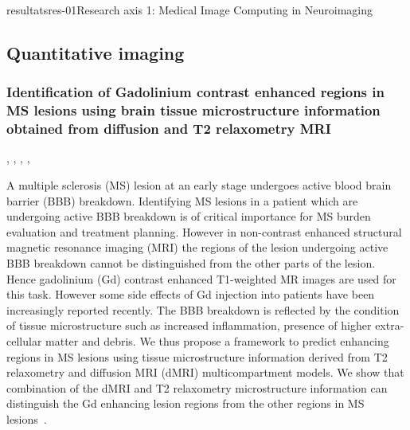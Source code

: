 \documentclass{ra2018}
\begin{document}
\begin{module}{resultats}{res-01}{Research axis 1: Medical Image Computing in Neuroimaging}
\subsection{Quantitative imaging}
\subsubsection{Identification of Gadolinium contrast enhanced regions in MS lesions using brain tissue microstructure information obtained from diffusion and T2 relaxometry MRI}
\begin{participants}
      , 
      ,
      ,
      ,
\end{participants}
A multiple sclerosis (MS) lesion at an early stage undergoes active blood brain barrier (BBB) breakdown. Identifying MS lesions in a patient which are undergoing active BBB breakdown is of critical importance for MS burden evaluation and treatment planning. However in non-contrast enhanced structural magnetic resonance imaging (MRI) the regions of the lesion undergoing active BBB breakdown cannot be distinguished from the other parts of the lesion. Hence gadolinium (Gd) contrast enhanced T1-weighted MR images are used for this task. However some side effects of Gd injection into patients have been increasingly reported recently. The BBB breakdown is reflected by the condition of tissue microstructure such as increased inflammation, presence of higher extra-cellular matter and debris. We thus propose a framework to predict enhancing regions in MS lesions using tissue microstructure information derived from T2 relaxometry and diffusion MRI (dMRI) multicompartment models. We show that combination of the dMRI and T2 relaxometry microstructure information can distinguish the Gd enhancing lesion regions from the other regions in MS lesions~\cite{chatterjee:hal-01830532}.



\end{module}
\end{document}
